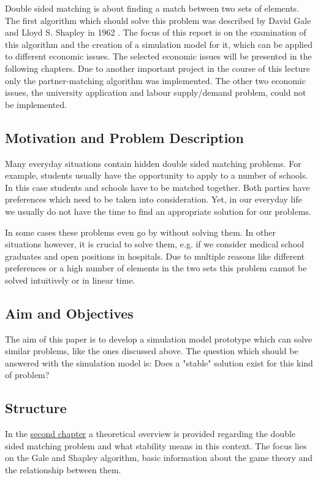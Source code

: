 \label{introduction}
Double sided matching is about finding a match between two sets of elements.
The first algorithm which should solve this problem was described by David Gale and Lloyd S. Shapley in 1962 \cite{gale62a}. 
The focus of this report is on the examination of this algorithm and the creation of a simulation model for it, which can be applied to different economic issues.
The selected economic issues will be presented in the following chapters. 
Due to another important project in the course of this lecture only the partner-matching algorithm was implemented.
The other two economic issues, the university application and labour supply/demand problem, could not be implemented.

\subsection{Motivation and Problem Description}
Many everyday situations contain hidden double sided matching problems. 
For example, students usually have the opportunity to apply to a number of schools. 
In this case students and schools have to be matched together. 
Both parties have preferences which need to be taken into consideration. 
Yet, in our everyday life we usually do not have the time to find an appropriate solution for our problems. 

In some cases these problems even go by without solving them. 
In other situations however, it is crucial to solve them, e.g. if we consider medical school graduates and open positions in hospitals. 
Due to multiple reasons like different preferences or a high number of elements in the two sets this problem cannot be solved intuitively or in linear time.

\subsection{Aim and Objectives}
The aim of this paper is to develop a simulation model prototype which can solve similar problems, like the ones discussed above.
The question which should be answered with the simulation model is: Does a "stable" solution exist for this kind of problem?

\subsection{Structure}
In the \hyperref[theory]{second chapter} a theoretical overview is provided regarding the double sided matching problem and what stability means in this context.
The focus lies on the Gale and Shapley algorithm, basic information about the game theory and the relationship between them.

